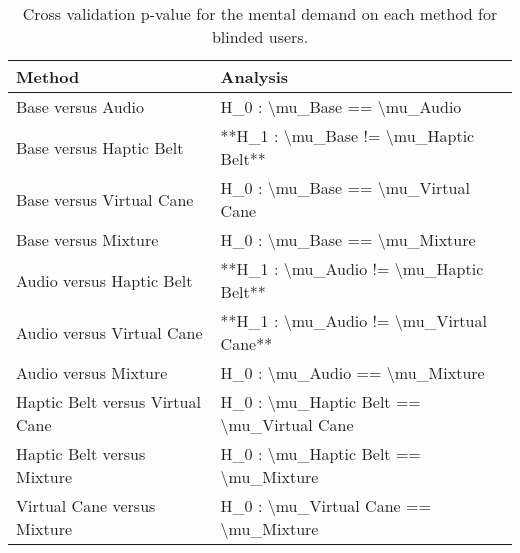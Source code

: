 
\begin{table}[!htb]
\centering
\caption{Cross validation p-value for the mental demand on each method for blinded users.}
\label{tab:lsd_mental_demand}
\begin{tabular}{ll}
\toprule
                         Method &                                  Analysis \\
\midrule
              Base versus Audio &               H\_0 : \textbackslash mu\_Base == \textbackslash mu\_Audio \\
        Base versus Haptic Belt &     **H\_1 : \textbackslash mu\_Base != \textbackslash mu\_Haptic Belt** \\
       Base versus Virtual Cane &        H\_0 : \textbackslash mu\_Base == \textbackslash mu\_Virtual Cane \\
            Base versus Mixture &             H\_0 : \textbackslash mu\_Base == \textbackslash mu\_Mixture \\
       Audio versus Haptic Belt &    **H\_1 : \textbackslash mu\_Audio != \textbackslash mu\_Haptic Belt** \\
      Audio versus Virtual Cane &   **H\_1 : \textbackslash mu\_Audio != \textbackslash mu\_Virtual Cane** \\
           Audio versus Mixture &            H\_0 : \textbackslash mu\_Audio == \textbackslash mu\_Mixture \\
Haptic Belt versus Virtual Cane & H\_0 : \textbackslash mu\_Haptic Belt == \textbackslash mu\_Virtual Cane \\
     Haptic Belt versus Mixture &      H\_0 : \textbackslash mu\_Haptic Belt == \textbackslash mu\_Mixture \\
    Virtual Cane versus Mixture &     H\_0 : \textbackslash mu\_Virtual Cane == \textbackslash mu\_Mixture \\
\bottomrule
\end{tabular}
\end{table}

